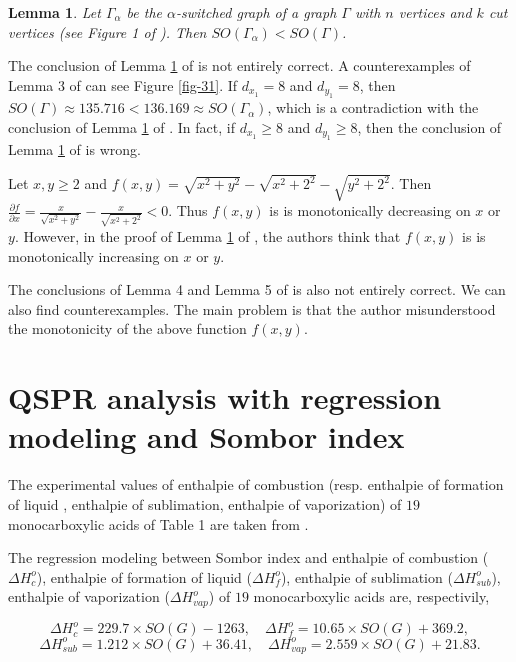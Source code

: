 \documentclass[a4paper,12pt]{article}
\newtheorem{lemma}[theorem]{Lemma}
\begin{document}
\begin{lemma}\label{l3-1}{\rm\cite{hare2023}\rm}
Let $\Gamma_{\alpha}$ be the $\alpha$-switched graph of a graph $\Gamma$ with $n$ vertices and $k$ cut vertices (see Figure 1 of \cite{hare2023}). Then $SO(\Gamma_{\alpha})<SO(\Gamma)$.
\end{lemma}
The conclusion of Lemma \ref{l3-1} of \cite{hare2023} is not entirely correct. A counterexamples of Lemma 3 of \cite{hare2023} can see Figure \ref{fig-31}. If $d_{x_{1}}= 8$ and $d_{y_{1}}= 8$, then
$SO(\Gamma)\approx 135.716<136.169\approx SO(\Gamma_{\alpha})$, which is a contradiction with the conclusion of Lemma \ref{l3-1} of \cite{hare2023}.
In fact, if $d_{x_{1}}\geq 8$ and $d_{y_{1}}\geq 8$, then the conclusion of Lemma \ref{l3-1} of \cite{hare2023} is wrong.

Let $x,y\geq 2$ and $f(x,y)=\sqrt{x^{2}+y^{2}}-\sqrt{x^{2}+2^{2}}-\sqrt{y^{2}+2^{2}}$.
Then $\frac{\partial f}{\partial x}=\frac{x}{\sqrt{x^{2}+y^{2}}}-\frac{x}{\sqrt{x^{2}+2^{2}}}<0$.
Thus $f(x,y)$ is is monotonically decreasing on $x$ or $y$.
However, in the proof of Lemma \ref{l3-1} of \cite{hare2023}, the authors think that $f(x,y)$ is is monotonically increasing on $x$ or $y$.

The conclusions of Lemma 4 and Lemma 5 of \cite{hare2023} is also not entirely correct. We can also find counterexamples. The main problem is that the author misunderstood the monotonicity of the above function $f(x,y)$.




\section{QSPR analysis with regression modeling and Sombor index}
\hskip 0.6cm
The experimental values of enthalpie of combustion (resp. enthalpie of formation of liquid , enthalpie of sublimation, enthalpie of vaporization) of $19$ monocarboxylic acids of Table 1 are taken from \cite{shai2015}.

The regression modeling between Sombor index and enthalpie of combustion ($\Delta H_{c}^{o}$), enthalpie of formation of liquid ($\Delta H_{f}^{o}$), enthalpie of sublimation ($\Delta H_{sub}^{o}$), enthalpie of vaporization ($\Delta H_{vap}^{o}$) of $19$ monocarboxylic acids are, respectivily,

$$\Delta H_{c}^{o}= 229.7\times SO(G)-1263,\quad  \Delta H_{f}^{o}= 10.65\times SO(G)+369.2,$$
$$\Delta H_{sub}^{o}= 1.212\times SO(G)+36.41,\quad  \Delta H_{vap}^{o}= 2.559\times SO(G)+21.83.$$
\end{document}
